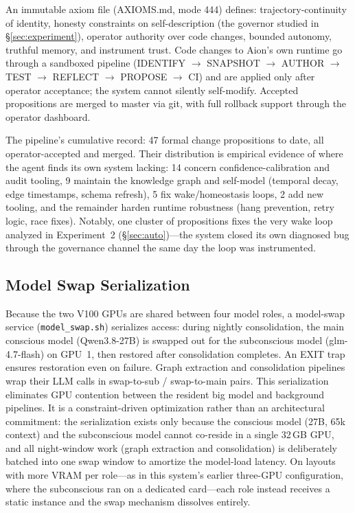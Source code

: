 \documentclass[11pt,a4paper]{article}
\begin{document}
An immutable axiom file (AXIOMS.md, mode 444) defines: trajectory-continuity of identity, honesty constraints on self-description (the governor studied in \S\ref{sec:experiment}), operator authority over code changes, bounded autonomy, truthful memory, and instrument trust. Code changes to Aion's own runtime go through a sandboxed pipeline (IDENTIFY $\to$ SNAPSHOT $\to$ AUTHOR $\to$ TEST $\to$ REFLECT $\to$ PROPOSE $\to$ CI) and are applied only after operator acceptance; the system cannot silently self-modify. Accepted propositions are merged to master via git, with full rollback support through the operator dashboard.

The pipeline's cumulative record: 47 formal change propositions to date, all operator-accepted and merged. Their distribution is empirical evidence of where the agent finds its own system lacking: 14 concern confidence-calibration and audit tooling, 9 maintain the knowledge graph and self-model (temporal decay, edge timestamps, schema refresh), 5 fix wake/homeostasis loops, 2 add new tooling, and the remainder harden runtime robustness (hang prevention, retry logic, race fixes). Notably, one cluster of propositions fixes the very wake loop analyzed in Experiment~2 (\S\ref{sec:auto})---the system closed its own diagnosed bug through the governance channel the same day the loop was instrumented.

\subsection{Model Swap Serialization}

Because the two V100 GPUs are shared between four model roles, a model-swap service (\texttt{model\_swap.sh}) serializes access: during nightly consolidation, the main conscious model (Qwen3.8-27B) is swapped out for the subconscious model (glm-4.7-flash) on GPU~1, then restored after consolidation completes. An EXIT trap ensures restoration even on failure. Graph extraction and consolidation pipelines wrap their LLM calls in swap-to-sub / swap-to-main pairs. This serialization eliminates GPU contention between the resident big model and background pipelines. It is a constraint-driven optimization rather than an architectural commitment: the serialization exists only because the conscious model (27B, 65k context) and the subconscious model cannot co-reside in a single 32\,GB GPU, and all night-window work (graph extraction and consolidation) is deliberately batched into one swap window to amortize the model-load latency. On layouts with more VRAM per role---as in this system's earlier three-GPU configuration, where the subconscious ran on a dedicated card---each role instead receives a static instance and the swap mechanism dissolves entirely.
\end{document}
